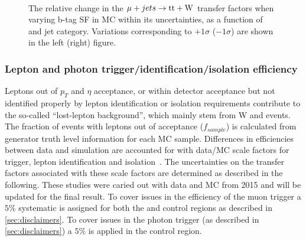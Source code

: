 \begin{figure}[!h]
  \centering
   ~~
  \\

  \caption{\label{fig:tfSyst_bsf_muToTtw} The relative change in the $\mu + jets \rightarrow \mathrm{tt+W}$ transfer
  factors when varying b-tag SF in MC within its uncertainties, as a function of \scalht and jet category. 
  Variations corresponding to $+1\sigma$ ($-1\sigma$) are shown in the left (right) figure. 
  }
\end{figure}





\subsubsection*{Lepton and photon trigger/identification/isolation efficiency}
\label{sec:tfSyst_lepton}

Leptons out of $p_{T}$ and $\eta$ acceptance, or within detector
acceptance but not identified properly by lepton identification or isolation
requirements contribute to the so-called ``lost-lepton background'', 
which mainly stem from W and \ttbar events. 
The fraction of events with leptons out of acceptance ($f_{sample}$)
is calculated from generator truth level information for each MC
sample. Differences in efficiencies between data and simulation are
accounted for with data/MC scale
factors for trigger, lepton identification and isolation~\cite{twiki-leptonSF}. 
The uncertainties on the transfer factors associated 
with these scale factors are determined as described in the following.
These studies were caried out with data and MC from 2015 and will be updated 
for the final result. To cover issues in the efficiency of the
muon trigger a $5\%$ systematic is assigned for both the \mj and \mmj 
control regions as described in \ref{sec:disclaimers}. To cover 
issues in the photon trigger (as described in \ref{sec:disclaimers}) a $5\%$ is applied in the
\gj control region.


